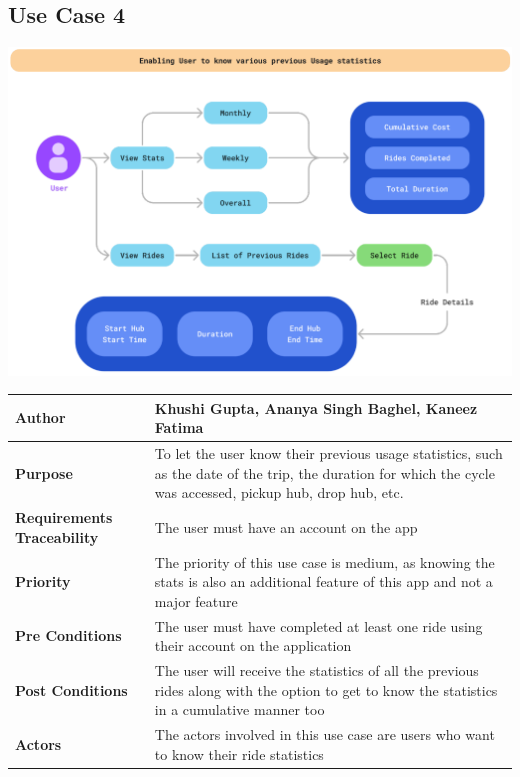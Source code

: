 \documentclass{scrreprt}
\begin{document}
\subsection{Use Case 4}
\begin{center}
\includegraphics*[scale=0.5]{usecase-4.png}
\begin{tabular}{|l|p{10cm}|}
    \hline
    \textbf{Author} & Khushi Gupta, Ananya Singh Baghel, Kaneez Fatima\\
    \hline
    \textbf{Purpose} &  To let the user know their previous usage statistics, such as the date of the trip, the duration for which the cycle was accessed, pickup hub, drop hub, etc.\\
    \hline
    \textbf{Requirements Traceability} & The user must have an account on the app\\
    \hline
    \textbf{Priority} &The priority of this use case is medium, as knowing the stats is also an additional feature of this app and not a major feature \\
    \hline
    \textbf{Pre Conditions} & The user must have completed at least one ride using their account on the application\\
    \hline
    \textbf{Post Conditions} & The user will receive the statistics of all the previous rides along with the option to get to know the statistics in a cumulative manner too\\
    \hline
    \textbf{Actors} &The actors involved in this use case are users who want to know their ride statistics \\
    \hline
\end{tabular}
\end{center}
\end{document}

